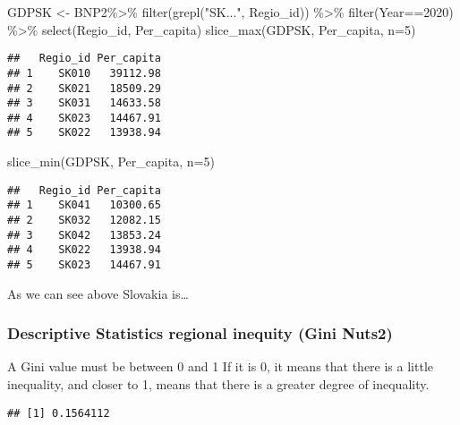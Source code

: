 \documentclass[
]{article}
\newenvironment{Shaded}{\begin{snugshade}}{\end{snugshade}}
\newcommand{\AttributeTok}[1]{\textcolor[rgb]{0.77,0.63,0.00}{#1}}
\newcommand{\DecValTok}[1]{\textcolor[rgb]{0.00,0.00,0.81}{#1}}
\newcommand{\FunctionTok}[1]{\textcolor[rgb]{0.00,0.00,0.00}{#1}}
\newcommand{\NormalTok}[1]{#1}
\newcommand{\OtherTok}[1]{\textcolor[rgb]{0.56,0.35,0.01}{#1}}
\newcommand{\SpecialCharTok}[1]{\textcolor[rgb]{0.00,0.00,0.00}{#1}}
\newcommand{\StringTok}[1]{\textcolor[rgb]{0.31,0.60,0.02}{#1}}
\begin{document}
\begin{Shaded}
\begin{Highlighting}[]
\NormalTok{GDPSK }\OtherTok{\textless{}{-}}\NormalTok{ BNP2}\SpecialCharTok{\%\textgreater{}\%}
  \FunctionTok{filter}\NormalTok{(}\FunctionTok{grepl}\NormalTok{(}\StringTok{"SK..."}\NormalTok{, Regio\_id)) }\SpecialCharTok{\%\textgreater{}\%}
  \FunctionTok{filter}\NormalTok{(Year}\SpecialCharTok{==}\DecValTok{2020}\NormalTok{) }\SpecialCharTok{\%\textgreater{}\%}
  \FunctionTok{select}\NormalTok{(Regio\_id, Per\_capita)}
\FunctionTok{slice\_max}\NormalTok{(GDPSK, Per\_capita, }\AttributeTok{n=}\DecValTok{5}\NormalTok{)}
\end{Highlighting}
\end{Shaded}

\begin{verbatim}
##   Regio_id Per_capita
## 1    SK010   39112.98
## 2    SK021   18509.29
## 3    SK031   14633.58
## 4    SK023   14467.91
## 5    SK022   13938.94
\end{verbatim}

\begin{Shaded}
\begin{Highlighting}[]
\FunctionTok{slice\_min}\NormalTok{(GDPSK, Per\_capita, }\AttributeTok{n=}\DecValTok{5}\NormalTok{)}
\end{Highlighting}
\end{Shaded}

\begin{verbatim}
##   Regio_id Per_capita
## 1    SK041   10300.65
## 2    SK032   12082.15
## 3    SK042   13853.24
## 4    SK022   13938.94
## 5    SK023   14467.91
\end{verbatim}

As we can see above Slovakia is\ldots{}

\hypertarget{descriptive-statistics-regional-inequity-gini-nuts2}{%
\subsubsection{Descriptive Statistics regional inequity (Gini
Nuts2)}\label{descriptive-statistics-regional-inequity-gini-nuts2}}

A Gini value must be between 0 and 1 If it is 0, it means that there is
a little inequality, and closer to 1, means that there is a greater
degree of inequality.

\begin{verbatim}
## [1] 0.1564112
\end{verbatim}
\end{document}
